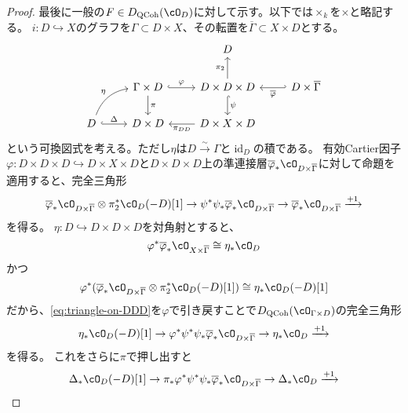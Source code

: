 \documentclass[uplatex, a4paper, dvipdfmx]{jsarticle}
\theoremstyle{definition}
\DeclareMathOperator{\id}{\mathrm{id}}
\DeclareMathOperator{\QCoh}{\mathrm{QCoh}}
\begin{document}
\begin{proof}
    最後に一般の$F \in D_{\QCoh}(\cO_D)$に対して示す。以下では$\times_k$を$\times$と略記する。
    $i \colon D \hookrightarrow X$のグラフを$\Gamma \subset D \times X$、その転置を$\overline{\Gamma} \subset X \times D$とする。
    \[
        \begin{tikzcd}
            && D &\\
            &\Gamma \times D \ar[r, hook, "\varphi"]\ar[d, "\pi"] &D \times D \times D \ar[d, hook, "\psi"] \ar[u, "\pi_2"] & D \times \overline{\Gamma} \ar[l, hook', "\overline{\varphi}"]\\
            D  \ar[r, hook, "\Delta"] \ar[ru, bend left, "\eta"]&D \times D & D \times X \times D \ar[l, "\pi_{DD}"] &
        \end{tikzcd}
    \]
    という可換図式を考える。ただし$\eta$は$D \xrightarrow{\sim} \Gamma$と$\id_D$の積である。
    有効Cartier因子$\varphi \colon D \times D \times D \hookrightarrow D \times X \times D$と$D \times D \times D$上の準連接層$\overline{\varphi}_*\cO_{D \times \overline{\Gamma}}$に対して命題を適用すると、完全三角形
    \begin{equation}\label{eq:triangle-on-DDD}
        \overline{\varphi}_* \cO_{D \times \overline{\Gamma}}\otimes \pi_2^*\cO_D(-D)[1]\to \psi^*\psi_*\overline{\varphi}_*\cO_{D \times \overline{\Gamma}}\to \overline{\varphi}_*\cO_{D \times \overline{\Gamma}} \xrightarrow{+1}
    \end{equation}
    を得る。
    $\eta \colon D \hookrightarrow D \times D \times D$を対角射とすると、
    \begin{equation}
        \varphi^*\overline{\varphi}_*\cO_{X \times \overline{\Gamma}} \cong \eta_*\cO_D
    \end{equation}
    かつ
    \begin{equation}
        \varphi^*(\overline{\varphi}_* \cO_{D \times \overline{\Gamma}}\otimes \pi_2^*\cO_D(-D)[1]) \cong \eta_*\cO_D(-D)[1]
    \end{equation}
    だから、\eqref{eq:triangle-on-DDD}を$\varphi$で引き戻すことで$D_{\QCoh}(\cO_{\Gamma \times D})$の完全三角形
    \begin{equation}
        \eta_*\cO_D(-D)[1] \to \varphi^*\psi^*\psi_*\overline{\varphi}_*\cO_{D \times \overline{\Gamma}} \to \eta_*\cO_D \xrightarrow{+1}
    \end{equation}
    を得る。
    これをさらに$\pi$で押し出すと
    \begin{equation}
        \Delta_*\cO_D(-D)[1] \to \pi_*\varphi^*\psi^*\psi_*\overline{\varphi}_*\cO_{D \times \overline{\Gamma}} \to \Delta_*\cO_D \xrightarrow{+1}

\end{equation}
\end{proof}
\end{document}

